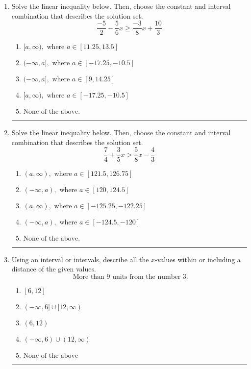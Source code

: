 \documentclass[14pt]{extbook}
\newcommand{\litem}[1]{\item#1\hspace*{-1cm}\rule{\textwidth}{0.4pt}}
\begin{document}
\begin{enumerate}
{\begin{enumerate}[label=\Alph*.]
\end{enumerate} }
\litem{
Solve the linear inequality below. Then, choose the constant and interval combination that describes the solution set.\[ \frac{-5}{2} - \frac{5}{6} x \geq \frac{-3}{8} x + \frac{10}{3} \]\begin{enumerate}[label=\Alph*.]
\item \( [a, \infty), \text{ where } a \in [11.25, 13.5] \)
\item \( (-\infty, a], \text{ where } a \in [-17.25, -10.5] \)
\item \( (-\infty, a], \text{ where } a \in [9, 14.25] \)
\item \( [a, \infty), \text{ where } a \in [-17.25, -10.5] \)
\item \( \text{None of the above}. \)

\end{enumerate} }
\litem{
Solve the linear inequality below. Then, choose the constant and interval combination that describes the solution set.\[ \frac{7}{4} + \frac{3}{5} x > \frac{5}{8} x - \frac{4}{3} \]\begin{enumerate}[label=\Alph*.]
\item \( (a, \infty), \text{ where } a \in [121.5, 126.75] \)
\item \( (-\infty, a), \text{ where } a \in [120, 124.5] \)
\item \( (a, \infty), \text{ where } a \in [-125.25, -122.25] \)
\item \( (-\infty, a), \text{ where } a \in [-124.5, -120] \)
\item \( \text{None of the above}. \)

\end{enumerate} }
\litem{
Using an interval or intervals, describe all the $x$-values within or including a distance of the given values.\[ \text{ More than } 9 \text{ units from the number } 3. \]\begin{enumerate}[label=\Alph*.]
\item \( [6, 12] \)
\item \( (-\infty, 6] \cup [12, \infty) \)
\item \( (6, 12) \)
\item \( (-\infty, 6) \cup (12, \infty) \)
\item \( \text{None of the above} \)

\end{enumerate} }
\end{enumerate}
\end{document}
